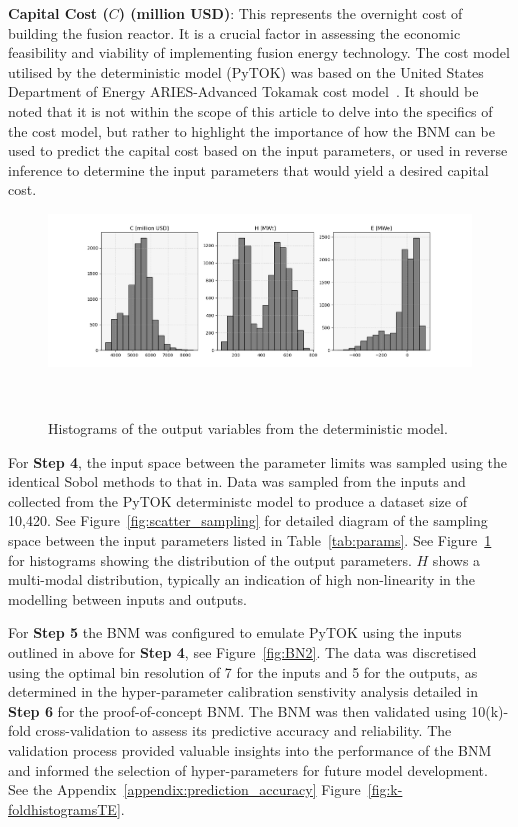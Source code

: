 \documentclass[journal]{IEEEtran}
\begin{document}
\textbf{Capital Cost ($C$) (million USD)}: This represents the overnight cost of building the fusion reactor. It is a crucial factor in assessing the economic feasibility and viability of implementing fusion energy technology. The cost model utilised by the deterministic model (PyTOK) was based on the United States Department of Energy ARIES-Advanced Tokamak cost model~\cite{Osti2017}. It should be noted that it is not within the scope of this article to delve into the specifics of the cost model, but rather to highlight the importance of how the BNM can be used to predict the capital cost based on the input parameters, or used in reverse inference to determine the input parameters that would yield a desired capital cost. 

\begin{figure}[t]
    \centering
    \includegraphics[width=\columnwidth]{figures/TE_results/output_dists_3vars.png}
    \caption{\small Histograms of the output variables from the deterministic model.}~\label{fig:outputs_marchdata}
\end{figure}

For \textbf{Step 4}, the input space between the parameter limits was sampled using the identical Sobol methods to that in\cite{Griffiths2024}. Data was sampled from the inputs and collected from the PyTOK deterministc model to produce a dataset size of 10,420. See Figure~\ref{fig:scatter_sampling} for detailed diagram of the sampling space between the input parameters listed in Table~\ref{tab:params}. See Figure~\ref{fig:outputs_marchdata} for histograms showing the distribution of the output parameters. $H$ shows a multi-modal distribution, typically an indication of high non-linearity in the modelling between inputs and outputs. 

For \textbf{Step 5} the BNM was configured to emulate PyTOK using the inputs outlined in above for \textbf{Step 4}, see Figure~\ref{fig:BN2}. The data was discretised using the optimal bin resolution of 7 for the inputs and 5 for the outputs, as determined in the hyper-parameter calibration senstivity analysis detailed in \textbf{Step 6} for the proof-of-concept BNM. The BNM was then validated using 10(k)-fold cross-validation to assess its predictive accuracy and reliability. The validation process provided valuable insights into the performance of the BNM and informed the selection of hyper-parameters for future model development. See the Appendix~\ref{appendix:prediction_accuracy} Figure~\ref{fig:k-foldhistogramsTE}.
\end{document}
